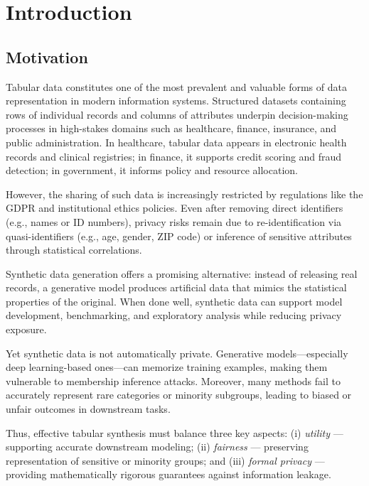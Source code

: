 \chapter{Introduction}
\label{chap:introduction}

\section{Motivation}
\label{sec:motivation}

Tabular data constitutes one of the most prevalent and valuable forms of data representation in modern information systems. Structured datasets containing rows of individual records and columns of attributes underpin decision-making processes in high-stakes domains such as healthcare, finance, insurance, and public administration. In healthcare, tabular data appears in electronic health records and clinical registries; in finance, it supports credit scoring and fraud detection; in government, it informs policy and resource allocation.

However, the sharing of such data is increasingly restricted by regulations like the GDPR and institutional ethics policies. Even after removing direct identifiers (e.g., names or ID numbers), privacy risks remain due to re-identification via quasi-identifiers (e.g., age, gender, ZIP code) or inference of sensitive attributes through statistical correlations.

Synthetic data generation offers a promising alternative: instead of releasing real records, a generative model produces artificial data that mimics the statistical properties of the original. When done well, synthetic data can support model development, benchmarking, and exploratory analysis while reducing privacy exposure.

Yet synthetic data is not automatically private. Generative models—especially deep learning-based ones—can memorize training examples, making them vulnerable to membership inference attacks. Moreover, many methods fail to accurately represent rare categories or minority subgroups, leading to biased or unfair outcomes in downstream tasks.

Thus, effective tabular synthesis must balance three key aspects:  
(i) \textit{utility} — supporting accurate downstream modeling;  
(ii) \textit{fairness} — preserving representation of sensitive or minority groups; and  
(iii) \textit{formal privacy} — providing mathematically rigorous guarantees against information leakage.  

